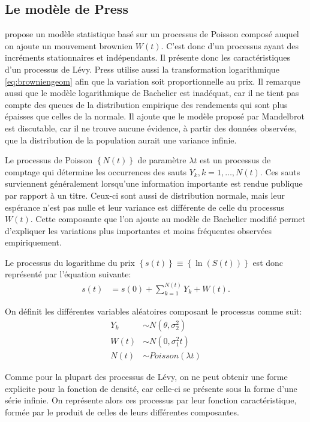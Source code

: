 \subsection{Le modèle de Press}
\label{sec:press}

\cite{press1967compound} propose un modèle statistique basé sur un
processus de Poisson composé auquel on ajoute un mouvement brownien
$W(t)$. C'est donc d'un processus ayant des incréments stationnaires
et indépendants. Il présente donc les caractéristiques d'un processus
de Lévy. Press utilise aussi la transformation logarithmique
\eqref{eq:browniengeom} afin que la variation soit proportionnelle au
prix. Il remarque aussi que le modèle logarithmique de Bachelier est
inadéquat, car il ne tient pas compte des queues de la distribution
empirique des rendements qui sont plus épaisses que celles de la
normale. Il ajoute que le modèle proposé par Mandelbrot est
discutable, car il ne trouve aucune évidence, à partir des données
observées, que la distribution de la population aurait une variance
infinie.

Le processus de Poisson $\left\{N(t)\right\}$ de paramètre $\lambda t$
est un processus de comptage qui détermine les occurrences des sauts
$Y_k, k = 1, \ldots, N(t)$. Ces sauts surviennent généralement
lorsqu'une information importante est rendue publique par rapport à un
titre. Ceux-ci sont aussi de distribution normale, mais leur espérance
n'est pas nulle et leur variance est différente de celle du processus
$W(t)$. Cette composante que l'on ajoute au modèle de Bachelier
modifié permet d'expliquer les variations plus importantes et moins
fréquentes observées empiriquement.

Le processus du logarithme du prix $\left\{s(t)\right\} \equiv
\left\{\ln{(S(t))}\right\}$ est donc représenté par l'équation
suivante:
\begin{align}
  \label{eq:press67}
  s(t) &= s(0) + \sum_{k=1}^{N(t)} Y_k + W(t).
\end{align}

On définit les différentes variables aléatoires composant le processus
comme suit:
\begin{align*}
  Y_k &\sim N(\theta,\sigma_2^2) \\
  W(t) &\sim N(0,\sigma_1^2 t) \\
  N(t) &\sim Poisson(\lambda t)
\end{align*}

Comme pour la plupart des processus de Lévy, on ne peut obtenir une
forme explicite pour la fonction de densité, car celle-ci se présente
sous la forme d'une série infinie. On représente alors ces processus
par leur fonction caractéristique, formée par le produit de celles de
leurs différentes composantes.

